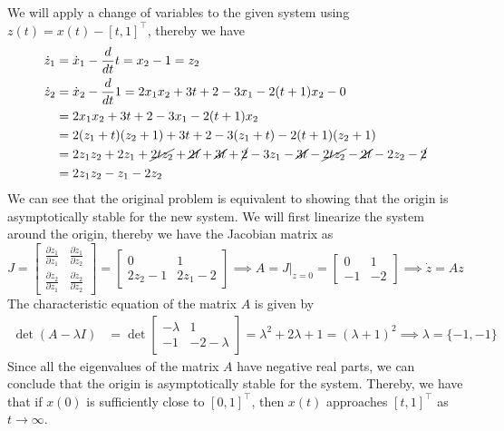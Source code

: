 We will apply a change of variables to the given system using \( z(t) = x(t) - {[t, 1]}^\top \), thereby we have
\begin{align*}
    \dot{z}_{1}
     & =
    \dot{x}_{1} - \frac{d}{dt} t
    =
    x_2 - 1
    =
    z_2
    \\
    \dot{z}_{2}
     & =
    \dot{x}_{2} - \frac{d}{dt} 1
    =
    2 x_{1} x_{2} + 3 t + 2 - 3 x_{1} - 2(t + 1) x_{2} - 0
    \\ & =
    2 x_{1} x_{2} + 3 t + 2 - 3 x_{1} - 2(t + 1) x_{2}
    \\ & =
    2 (z_1 + t) (z_2 + 1) + 3 t + 2 - 3 (z_1 + t) - 2(t + 1) (z_2 + 1)
    \\ & =
    2 z_1 z_2 + 2 z_1 + \cancel{2 t z_2} + \cancel{2 t} + \cancel{3 t} + \cancel{2} - 3 z_1 - \cancel{3 t} - \cancel{2 t z_2} - \cancel{2 t} - 2 z_2 - \cancel{2}
    \\ & =
    2 z_1 z_2 - z_1 - 2 z_2
\end{align*}
We can see that the original problem is equivalent to showing that the origin is asymptotically stable for the new system.
We will first linearize the system around the origin, thereby we have the Jacobian matrix as
\begin{equation*}
    J
    =
    \begin{bmatrix}
        \frac{\partial \dot{z}_{1}}{\partial z_1} & \frac{\partial \dot{z}_{1}}{\partial z_2} \\
        \frac{\partial \dot{z}_{2}}{\partial z_1} & \frac{\partial \dot{z}_{2}}{\partial z_2}
    \end{bmatrix}
    =
    \begin{bmatrix}
        0         & 1         \\
        2 z_2 - 1 & 2 z_1 - 2
    \end{bmatrix}
    \implies
    A = J|_{z=0}
    =
    \begin{bmatrix}
        0  & 1  \\
        -1 & -2
    \end{bmatrix}
    \implies
    \dot{z} = A z
\end{equation*}
The characteristic equation of the matrix \( A \) is given by
\begin{align*}
    \det(A - \lambda I)
     & =
    \det
    \begin{bmatrix}
        -\lambda & 1            \\
        -1       & -2 - \lambda
    \end{bmatrix}
    =
    \lambda^2 + 2 \lambda + 1
    =
    {(\lambda + 1)}^2
    \implies
    \lambda = \{ -1, -1 \}
\end{align*}
Since all the eigenvalues of the matrix \( A \) have negative real parts, we can conclude that the origin is asymptotically stable for the system.
Thereby, we have that if \( x(0) \) is sufficiently close to \( {[0, 1]}^\top \), then \( x(t) \) approaches \( {[t, 1]}^\top \) as \( t \rightarrow \infty \).
